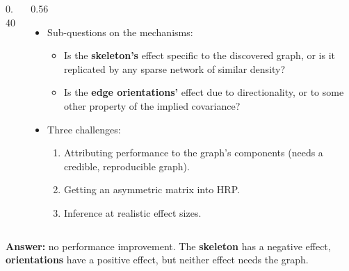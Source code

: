 \documentclass[
	aspectratio=169,
	t,
	onlytextwidth,
	10pt,
]{beamer}
\newcommand{\key}[1]{\textcolor{ICLBlue}{\textbf{#1}}}
\newcommand{\refs}[1]{\ifx\\#1\\\else\footnotetext{\tiny\textcolor{ctrl}{#1}}\fi}
\begin{document}
\begin{frame}
\begin{columns}[T]
\begin{column}{0.40\linewidth}
		\end{column}
		\begin{column}{0.56\linewidth}
			\begin{itemize}
				\setlength{\itemsep}{3pt}
				\item Sub-questions on the mechanisms: 
                \begin{itemize}
                    \item Is the \textcolor{skel}{\textbf{skeleton's}} effect specific to the discovered graph, or is it replicated by
                    any sparse network of similar density?
                    \item Is the \textcolor{orient}{\textbf{edge orientations'}} effect due to directionality, or to some other property of the implied covariance?
                \end{itemize}
				\item Three challenges:
                \begin{enumerate}
                  \item Attributing performance to the graph's components
                        (needs a credible, reproducible graph).
                  \item Getting an asymmetric matrix into HRP.
                  \item Inference at realistic effect sizes.
                \end{enumerate}
			\end{itemize}
		\end{column}
	\end{columns}
    \vspace{0.1em}
    \key{Answer:} no performance improvement. The \textcolor{skel}{\textbf{skeleton}} has a negative effect, \textcolor{orient}{\textbf{orientations}} have a positive effect, but neither effect needs the graph.
	\refs{}
\end{frame}

\end{document}
